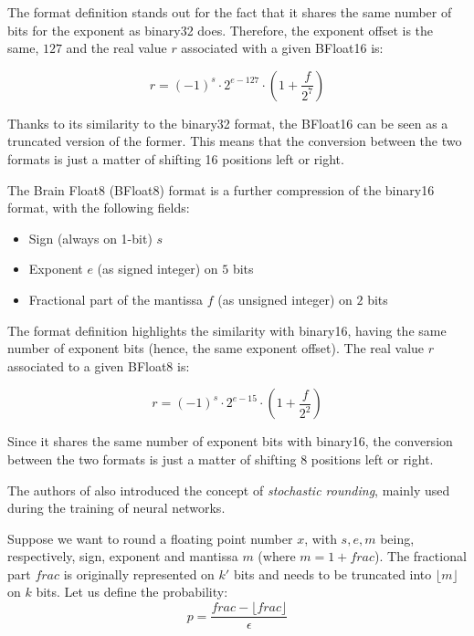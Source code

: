 The format definition stands out for the fact that it shares the same number of bits for the exponent as binary32 does. Therefore, the exponent offset is the same, $127$ and the real value $r$ associated with a given BFloat16 is:

\begin{equation}\label{eqn:bfloat162real}
    r = (-1)^s \cdot 2^{e-127} \cdot \left(1 + \frac{f}{2^7} \right)
\end{equation}

Thanks to its similarity to the binary32 format, the BFloat16 can be seen as a truncated version of the former. This means that the conversion between the two formats is just a matter of shifting 16 positions left or right.

The Brain Float8 (BFloat8) format \cite{naveen2019mixed} is a further compression of the binary16 format, with the following fields:

\begin{itemize}
    \item Sign (always on 1-bit) $s$
    \item Exponent $e$ (as signed integer) on $5$ bits
    \item Fractional part of the mantissa $f$ (as unsigned integer) on $2$ bits
\end{itemize}

The format definition highlights the similarity with binary16, having the same number of exponent bits (hence, the same exponent offset). The real value $r$ associated to a given BFloat8 is:

\begin{equation}\label{eqn:bfloat82real}
    r = (-1)^s \cdot 2^{e-15} \cdot \left(1 + \frac{f}{2^2} \right)
\end{equation}

Since it shares the same number of exponent bits with binary16, the conversion between the two formats is just a matter of shifting 8 positions left or right.

The authors of \cite{naveen2019mixed} also introduced the concept of \textit{stochastic rounding}, mainly used during the training of neural networks.

Suppose we want to round a floating point number $x$, with $s,e,m$ being, respectively, sign, exponent and mantissa $m$ (where $m = 1 + frac$). The fractional part $frac$ is originally represented on $k'$ bits and needs to be truncated into $\lfloor m \rfloor$ on $k$ bits. Let us define the probability: 
\begin{equation}\label{eqn:bfloat8StochProb}
    p = \frac{frac- \lfloor frac \rfloor}{\epsilon}
\end{equation}

